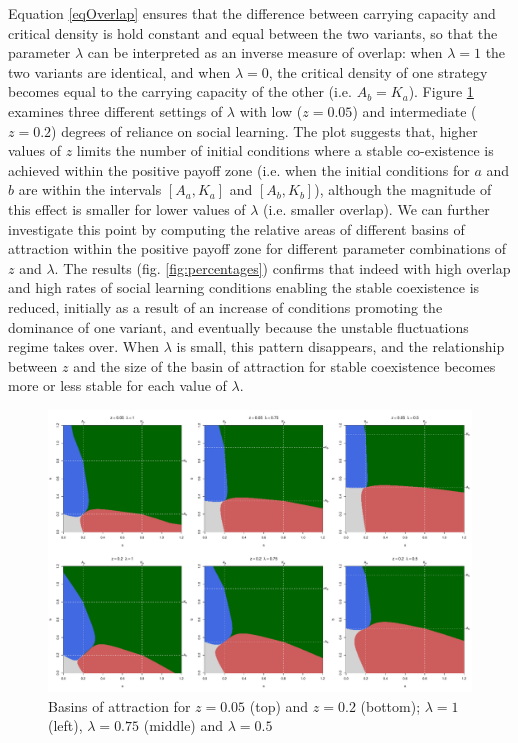 \documentclass[review,authoryear]{elsarticle}
\begin{document}
Equation \eqref{eqOverlap} ensures that the difference between carrying capacity and critical density is hold constant and equal between the two variants, so that the parameter $\lambda$ can be interpreted as an inverse  measure of overlap: when $\lambda=1$ the two variants are identical, and when $\lambda=0$, the critical density of one strategy becomes equal to the carrying capacity of the other (i.e. $A_b=K_a$). Figure \ref{fig:overlap} examines three different settings of $\lambda$  with low ($z=0.05$) and intermediate ($z=0.2$) degrees of reliance on social learning. The plot suggests that, higher values of $z$ limits the number of initial conditions where a stable co-existence is achieved within the positive payoff zone (i.e. when the initial conditions for $a$ and $b$ are within the intervals $[A_a,K_a]$ and $[A_b,K_b]$), although the magnitude of this effect is smaller for lower values of $\lambda$ (i.e. smaller overlap). We can further investigate this point by computing the relative areas of different basins of attraction within the positive payoff zone for different parameter combinations of $z$ and $\lambda$. The results (fig. \ref{fig:percentages}) confirms that indeed with high overlap and high rates of social learning conditions enabling the stable coexistence is reduced, initially as a result of an increase of conditions promoting the dominance of one variant, and eventually because the unstable fluctuations regime takes over. When  $\lambda$ is small, this pattern disappears, and the relationship between $z$ and the size of the basin of attraction for stable coexistence becomes more or less stable for each value of $\lambda$. 

\begin{figure}
  \centering
      \includegraphics[width=\textwidth]{./figures/figure5}
  \caption{Basins of attraction for $z=0.05$ (top) and $z=0.2$ (bottom); $\lambda=1$ (left), $\lambda=0.75$ (middle) and $\lambda=0.5$}
    \label{fig:overlap}
\end{figure}
\end{document}
